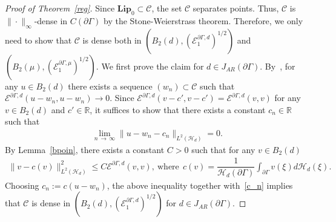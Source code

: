 \documentclass[AHL,Unicode,longabstracts,published]{cedram}
\newcommand{\ce}{\mathcal{E}}
\newcommand{\ch}{\mathcal{H}}
\newcommand{\cC}{\mathcal{C}}
\newcommand{\br}{\mathbb{R}}
\newcommand{\bfLip}{\mathbf{Lip}}
\begin{document}
\begin{proof}[{Proof of Theorem~\ref{reg}}]
Since $\bfLip_0\subset\cC$, the set $\cC$ separates points. Thus, $\cC$ is $\|\cdot\|_{\infty}$-dense in $C(\partial\Gamma)$ by the Stone-Weierstrass theorem. Therefore, we only need to show that $\cC$ is dense both in $(B_2(d), (\ce^{\partial\Gamma,d}_1)^{1/2})$ and $(B_{2}(\mu),(\ce^{\partial\Gamma,\mu}_1)^{1/2})$. We first prove the claim for $d\in J_{AR}(\partial\Gamma)$. By~\cite[Proposition~3.13]{Cos}, for any $u\in B_2(d)$ there exists a sequence $(w_n)\subset\cC$ such that $\ce^{\partial\Gamma,d}(u-w_n,u-w_n)\rightarrow0$. Since $\ce^{\partial\Gamma,d}(v-c',v-c')=\ce^{\partial\Gamma,d}(v,v)$ for any $v\in B_2(d)$ and $c'\in\br$, it suffices to show that there exists a constant $c_n\in\br$ such that
\begin{align}\label{c_n}
\lim_{n\,\to\,\infty}\|u-w_n-c_n\|_{L^2(\ch_{d})}=0.
\end{align}
By Lemma~\ref{bpoin}, there exists a constant $C>0$ such that for any $v\in B_2(d)$
\begin{align*}
\|v-c(v)\|_{L^2(\ch_{d})}^2\leq C\ce^{\partial\Gamma,d}(v,v),\ \text{where}\ \ c(v)=\dfrac{1}{\ch_d(\partial\Gamma)}\int_{\partial\Gamma}v(\xi)d\ch_d(\xi).
\end{align*}
Choosing $c_n:=c(u-w_n)$, the above inequality together with~\eqref{c_n} implies that $\cC$ is dense in $(B_2(d),(\ce^{\partial\Gamma,d}_1)^{1/2})$ for $d\in J_{AR}(\partial\Gamma)$.



\end{proof}
\end{document}
